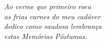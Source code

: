 \begin{dedicatoria}
\vspace*{\fill}
\centering
\noindent
\textit{
Ao verme que primeiro roeu\\
as frias carnes do meu cadáver\\
dedico como saudosa lembrança\\
estas Memórias Póstumas.
}
\vspace*{\fill}
\end{dedicatoria}